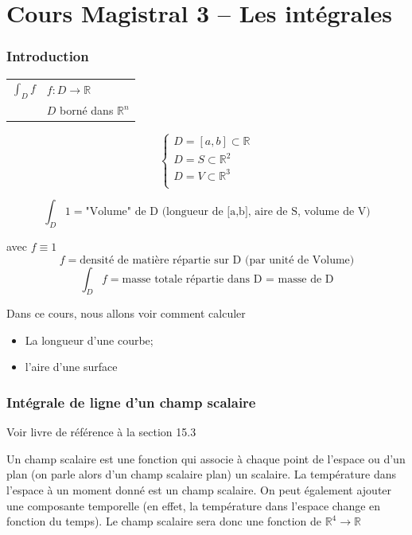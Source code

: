 \part{Cours Magistral 3 -- Les intégrales}
\section{Introduction}

\begin{center}
\begin{tabular}{l l}

$\int_D f$ &  $f: D\to \mathbb{R}$ \\
&$D$ borné dans $\mathbb{R}^n$
\end{tabular}

\end{center}


$$\left\{
\begin{array}{l}
D=[a,b]\subset\mathbb{R}\\
D=S\subset\mathbb{R}^2\\
D=V\subset\mathbb{R}^3\\
\end{array}
\right.$$



\[\int_D 1 = \text{"Volume" de D (longueur de [a,b], aire de S, volume de V)}\]

avec $f\equiv1$
\[ f=\text{densité de matière répartie sur D (par unité de Volume)} \]
\[\int_D f = \text{masse totale répartie dans D = masse de D}\]

Dans ce cours, nous allons voir comment calculer
\begin{itemize}
\item La longueur d'une courbe;
\item l'aire d'une surface
\end{itemize}

\section{Intégrale de ligne d'un champ scalaire}

Voir livre de référence à la section 15.3

Un champ scalaire est une fonction qui associe à chaque point de l'espace ou d'un plan (on parle alors d'un champ scalaire plan) un scalaire. La température dans l'espace à un moment donné est un champ scalaire. On peut également ajouter une composante temporelle (en effet, la température dans l'espace change en fonction du temps). Le champ scalaire sera donc une fonction de $\mathbb{R}^4 \to \mathbb{R} $

